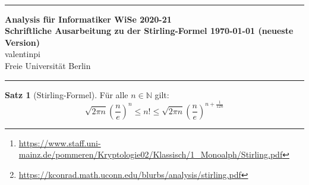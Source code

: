 \documentclass[10pt,fleqn]{article}
\theoremstyle{definition}
\newtheorem{theorem}{Satz}
\theoremstyle{remark}
\newcommand{\Authors}{valentinpi}
\begin{document}
\vspace*{-12ex}
\phantom{}\\
\noindent\rule{\textwidth}{0.1pt}
\large \textbf{Analysis für Informatiker \hfill WiSe 2020-21} \vspace*{0.25cm}\\
\normalsize \textbf{Schriftliche Ausarbeitung zu der Stirling-Formel \hfill \today { (neueste Version)}}\\
\Authors\\
Freie Universität Berlin\\
\noindent\rule{\textwidth}{0.1pt}

\begin{abstract}
    \noindent Ziel dieser Ausarbeitung ist es, die in der Vorlesung unbewiesene Formel von \textsc{Stirling} zu beweisen, und dabei weitgehend die nötigen Hilfsformeln mit unseren bisherigen Kenntnissen selbst herzuleiten. Insbesondere versuchen wir hier ein Verständnis für recht erweiterte Werkzeuge zu entwickeln, trotz dass wir diese nicht beweisen werden. Genutzt wird eine weitere Ausarbeitung der Uni Mainz.\footnote{\url{https://www.staff.uni-mainz.de/pommeren/Kryptologie02/Klassisch/1_Monoalph/Stirling.pdf}}\\
    
    \noindent Die in der Komplexitätsanalyze genutzte Formel von James Stirling hat eine reiche Geschichte. Ein Ansatz hier für Quellen ist das Dokument \emph{Methodus Differentialis} von 1730. In anderen Papern zu diesem Thema kann man aber deutlich mehr erfahren. Wen dies interessiert: Diese\footnote{\url{https://kconrad.math.uconn.edu/blurbs/analysis/stirling.pdf}} Ausarbeitung von Keith Conrad ist sehr empfehlenswert. Etwa hat \textsc{DeMoivre} bei der Entdeckung seinen Anteil gehabt. Ausserdem wird darüber geredet, wie Stirling auf die Rolle der Konstante \(\pi\) in der Formel kam.
\end{abstract}

\begin{theorem}[Stirling-Formel] Für alle \(n \in \mathbb{N}\) gilt:
    \[
        \sqrt{2 \pi n} \left(\frac{n}{e}\right)^n \leq n! \leq \sqrt{2 \pi n} \left(\frac{n}{e}\right)^{n+\frac{1}{12n}}
    \]
\end{theorem}
\end{document}
